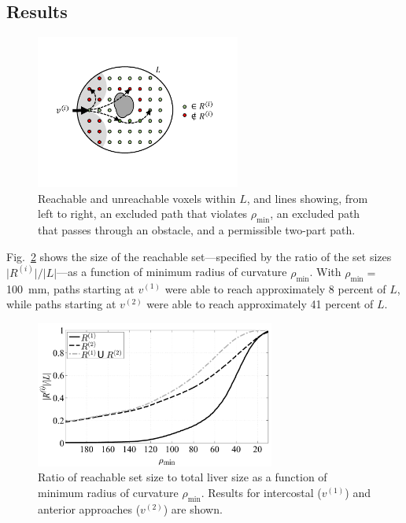 \subsection{Results}
\begin{figure}[!t]
\centering
\includegraphics[width = 0.6\textwidth]{Images/Chapter3/Paths/Paths}%
\caption[Excluded and permissible paths]{Reachable and unreachable voxels within $L$, and lines showing, from left to right, an excluded path that violates $\rho_{\text{min}}$, an excluded path that passes through an obstacle, and a permissible two-part path. }
\label{fig:Paths}
\end{figure}

Fig.~\ref{fig:ReachableSizeByRho} shows the size of the reachable set---specified by the ratio of the set sizes $\lvert R^{(i)} \rvert / \lvert L \rvert$---as a function of minimum radius of curvature $\rho_{\text{min}}$. With $\rho_{\text{min}} =$ 100~mm, paths starting at $v^{(1)}$ were able to reach approximately 8 percent of $L$, while paths starting at $v^{(2)}$ were able to reach approximately 41 percent of $L$. 

\begin{figure}[!t]
\centering
\includegraphics[width = 0.7\textwidth]{Images/Chapter3/ReachableSizeByRho/ReachableSizeByRho}%
\caption[Impact of radius of curvature on reachable set size]{Ratio of reachable set size to total liver size as a function of minimum radius of curvature $\rho_{\text{min}}$. Results for intercostal ($v^{(1)}$) and anterior approaches ($v^{(2)}$) are shown.}
\label{fig:ReachableSizeByRho}
\end{figure}

